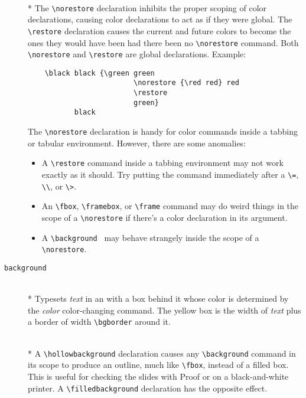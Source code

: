 \begin{description}
\item[{\tt
\begin{tabular}[b]{@{}l@{}}
 \bs norestore\\ 
 \bs restore
\end{tabular}}] \mbox{}\\*
The \verb+\norestore+ declaration inhibits the proper scoping of color
declarations, causing color declarations to act as if they were global.
The \verb+\restore+ declaration causes the current and future colors to
become the ones they would have been had there been no \verb+\norestore+
command.  Both \verb+\norestore+ and \verb+\restore+ are global declarations.
Example:
\begin{verbatim}
    \black black {\green green 
                         \norestore {\red red} red
                         \restore 
                         green} 
           black
\end{verbatim}     
The \verb+\norestore+ declaration is handy for color commands inside a
tabbing or tabular environment.  However, there are some anomalies:
 
\begin{itemize}
\item A \verb+\restore+ command inside a tabbing environment may not
work exactly as it should.  Try putting the command immediately after a
\verb+\=+, \verb+\\+, or \verb+\>+. 
 
\item An \verb+\fbox+, \verb+\framebox+, or \verb+\frame+ command may
do weird things in the scope of a \verb+\norestore+ if there's a color
declaration in its argument.
     
\item A \verb+\background + may behave strangely inside the scope of a
 \linebreak %
\verb+\norestore+.
\end{itemize}     
 
\item[{\tt \bs background\rb{}\rb }]
\mbox{}\\*
Typesets {\em text} in an \mbox with a box behind it whose color is
determined by the {\em color\/} color-changing command.  The yellow box
is the width of {\em text\/} plus a border of width \verb+\bgborder+
around it.  
 
\item[{\tt
\begin{tabular}[b]{@{}l@{}}
 \bs hollowbackground \\
 \bs filledbackground
\end{tabular}}] \mbox{}\\*
A \verb+\hollowbackground+ declaration causes any 
\verb+\background+
command in its scope to produce an outline, much like \verb+\fbox+,
instead of a filled box.  This is useful for checking the slides with
Proof or on a black-and-white printer.  A \verb+\filledbackground+
declaration has the opposite effect.  
 

\end{description}
